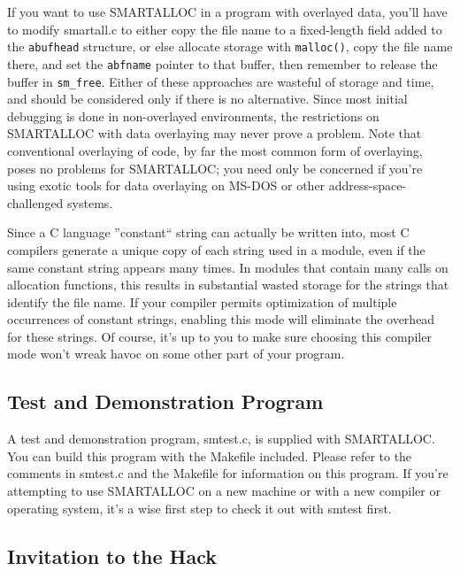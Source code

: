 If you want to use SMARTALLOC in a program with overlayed data, you'll have to
modify smartall.c to either copy the file name to a fixed-length field added
to the {\tt abufhead} structure, or else allocate storage with {\tt malloc()},
copy the file name there, and set the {\tt abfname} pointer to that buffer,
then remember to release the buffer in {\tt sm\_free}. Either of these
approaches are wasteful of storage and time, and should be considered only if
there is no alternative. Since most initial debugging is done in non-overlayed
environments, the restrictions on SMARTALLOC with data overlaying may never
prove a problem. Note that conventional overlaying of code, by far the most
common form of overlaying, poses no problems for SMARTALLOC; you need only be
concerned if you're using exotic tools for data overlaying on MS-DOS or other
address-space-challenged systems.

Since a C language ''constant`` string can actually be written into, most C
compilers generate a unique copy of each string used in a module, even if the
same constant string appears many times. In modules that contain many calls on
allocation functions, this results in substantial wasted storage for the
strings that identify the file name. If your compiler permits optimization of
multiple occurrences of constant strings, enabling this mode will eliminate
the overhead for these strings. Of course, it's up to you to make sure
choosing this compiler mode won't wreak havoc on some other part of your
program.

\subsection{ Test and Demonstration Program}

A test and demonstration program, smtest.c, is supplied with SMARTALLOC. You
can build this program with the Makefile included. Please refer to the
comments in smtest.c and the Makefile for information on this program. If
you're attempting to use SMARTALLOC on a new machine or with a new compiler or
operating system, it's a wise first step to check it out with smtest first.

\subsection{ Invitation to the Hack}


